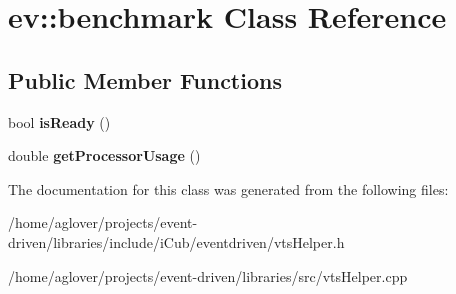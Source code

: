 \hypertarget{classev_1_1benchmark}{}\section{ev\+:\+:benchmark Class Reference}
\label{classev_1_1benchmark}
\subsection*{Public Member Functions}
\begin{DoxyCompactItemize}
\item 
bool {\bfseries is\+Ready} ()\hypertarget{classev_1_1benchmark_a10722bcfcf5df8e34fc2f17e0247290f}{}\label{classev_1_1benchmark_a10722bcfcf5df8e34fc2f17e0247290f}

\item 
double {\bfseries get\+Processor\+Usage} ()\hypertarget{classev_1_1benchmark_a23509b8f8895bafdb36e8bccfc14f82b}{}\label{classev_1_1benchmark_a23509b8f8895bafdb36e8bccfc14f82b}

\end{DoxyCompactItemize}


The documentation for this class was generated from the following files\+:\begin{DoxyCompactItemize}
\item 
/home/aglover/projects/event-\/driven/libraries/include/i\+Cub/eventdriven/vts\+Helper.\+h\item 
/home/aglover/projects/event-\/driven/libraries/src/vts\+Helper.\+cpp\end{DoxyCompactItemize}
